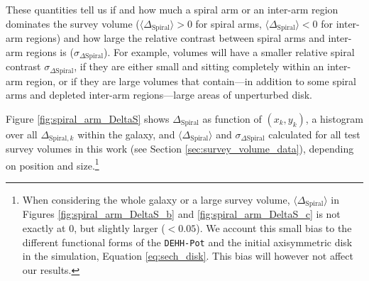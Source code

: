 \documentclass[iop,revtex4,numberedappendix,appendixfloats]{emulateapj}
\begin{document}
These quantities tell us if and how much a spiral arm or an inter-arm region dominates the survey volume ($\langle \Delta_\text{Spiral} \rangle > 0$ for spiral arms, $\langle \Delta_\text{Spiral} \rangle < 0$ for inter-arm regions) and how large the relative contrast between spiral arms and inter-arm regions is ($\sigma_{\Delta\text{Spiral}}$). For example, volumes will have a smaller relative spiral contrast $\sigma_{\Delta\text{Spiral}}$, if they are either small and sitting completely within an inter-arm region, or if they are large volumes that contain---in addition to some spiral arms and depleted inter-arm regions---large areas of unperturbed disk.

Figure \ref{fig:spiral_arm_DeltaS} shows $\Delta_\text{Spiral}$ as function of $(x_k,y_k)$, a histogram over all $\Delta_{\text{Spiral},k}$ within the galaxy, and $\langle \Delta_\text{Spiral} \rangle$ and $\sigma_{\Delta\text{Spiral}}$ calculated for all test survey volumes in this work (see Section \ref{sec:survey_volume_data}), depending on position and size.\footnote{When considering the whole galaxy or a large survey volume, $\langle \Delta_\text{Spiral} \rangle$ in Figures \ref{fig:spiral_arm_DeltaS_b} and \ref{fig:spiral_arm_DeltaS_c} is not exactly at $0$, but slightly larger ($<0.05$). We account this small bias to the different functional forms of the \texttt{DEHH-Pot} and the initial axisymmetric disk in the simulation, Equation \eqref{eq:sech_disk}. This bias will however not affect our results.}
\end{document}
